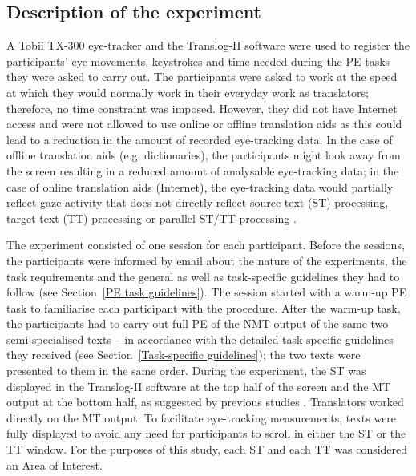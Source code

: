 \documentclass[output=paper]{langscibook}
\begin{document}
\subsection{Description of the experiment} \label{Description of the experiment}
A Tobii TX-300 eye-tracker and the Translog-II software \citep{carl-2012-translog} were used to register the participants’ eye movements, keystrokes and time needed during the PE tasks they were asked to carry out. The participants were asked to work at the speed at which they would normally work in their everyday work as translators; therefore, no time constraint was imposed. However, they did not have Internet access and were not allowed to use online or offline translation aids as this could lead to a reduction in the amount of recorded eye-tracking data. In the case of offline translation aids (e.g. dictionaries), the participants might look away from the screen resulting in a reduced amount of analysable eye-tracking data; in the case of online translation aids (Internet), the eye-tracking data would partially reflect gaze activity that does not directly reflect source text (ST) processing, target text (TT) processing or parallel ST/TT processing \citep[86]{Hvelplund2011}.

The experiment consisted of one session for each participant. Before the sessions, the participants were informed by email about the nature of the experiments, the task requirements and the general as well as task-specific guidelines they had to follow (see Section~\ref{PE task guidelines}). The session started with a warm-up PE task to familiarise each participant with the procedure. After the warm-up task, the participants had to carry out full PE of the NMT output of the same two semi-specialised texts – in accordance with the detailed task-specific guidelines they received (see Section~\ref{Task-specific guidelines}); the two texts were presented to them in the same order. During the experiment, the ST was displayed in the Translog-II software at the top half of the screen and the MT output at the bottom half, as suggested by previous studies \citep{Hvelplund2011, Mesa-Lao2014, CarlJakobsen2011, CarlHansen-Schirra2015, SchaltzGarcia2015}. Translators worked directly on the MT output. To facilitate eye-tracking measurements, texts were fully displayed to avoid any need for participants to scroll in either the ST or the TT window. For the purposes of this study, each ST and each TT was considered an Area of Interest.
\end{document}
